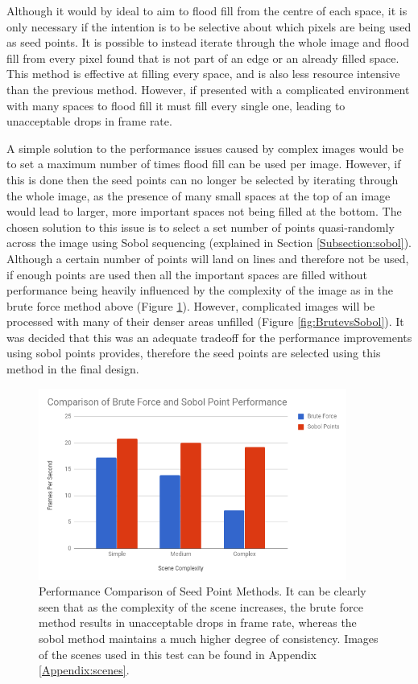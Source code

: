 Although it would by ideal to aim to flood fill from the centre of each space, it is only necessary if the intention is to be selective about which pixels are being used as seed points. It is possible to instead iterate through the whole image and flood fill from every pixel found that is not part of an edge or an already filled space. This method is effective at filling every space, and is also less resource intensive than the previous method. However, if presented with a complicated environment with many spaces to flood fill it must fill every single one, leading to unacceptable drops in frame rate.

A simple solution to the performance issues caused by complex images would be to set a maximum number of times flood fill can be used per image. However, if this is done then the seed points can no longer be selected by iterating through the whole image, as the presence of many small spaces at the top of an image would lead to larger, more important spaces not being filled at the bottom. The chosen solution to this issue is to select a set number of points quasi-randomly across the image using Sobol sequencing (explained in Section \ref{Subsection:sobol}). Although a certain number of points will land on lines and therefore not be used, if enough points are used then all the important spaces are filled without performance being heavily influenced by the complexity of the image as in the brute force method above (Figure \ref{fig:fpscomp}). However, complicated images will be processed with many of their denser areas unfilled (Figure \ref{fig:BrutevsSobol}). It was decided that this was an adequate tradeoff for the performance improvements using sobol points provides, therefore the seed points are selected using this method in the final design.

\begin{figure}[H]
    \begin{center}
      \includegraphics[width=0.9\textwidth]{Figures/FPSComp.png}
      \caption[Performance Comparison of Seed Point Methods]{Performance Comparison of Seed Point Methods. It can be clearly seen that as the complexity of the scene increases, the brute force method results in unacceptable drops in frame rate, whereas the sobol method maintains a much higher degree of consistency. Images of the scenes used in this test can be found in Appendix \ref{Appendix:scenes}.}
      \label{fig:fpscomp}
    \end{center}
\end{figure}

